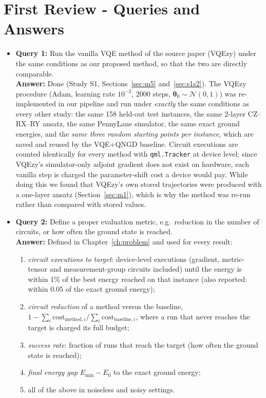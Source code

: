 \documentclass{ssnreview}
\begin{document}
\chapter{First Review - Queries and Answers}
\begin{itemize}
  \item \textbf{Query 1:} Run the vanilla VQE method of the source paper (VQEzy) under the
        same conditions as our proposed method, so that the two are directly comparable. \\
        \textbf{Answer:} Done (Study S1, Sections~\ref{sec:m5} and~\ref{sec:s1s2}). The VQEzy
        procedure (Adam, learning rate $10^{-3}$, 2000 steps,
        $\boldsymbol\theta_0\sim\mathcal N(0,1)$) was re-implemented in our pipeline and run under
        \emph{exactly} the same conditions as every other study: the same 158 held-out test
        instances, the same 2-layer CZ--RX--RY ansatz, the same PennyLane simulator, the same
        exact ground energies, and the \emph{same three random starting points per instance},
        which are saved and reused by the VQE+QNGD baseline. Circuit executions are counted
        identically for every method with \texttt{qml.Tracker} at device level; since VQEzy's
        simulator-only adjoint gradient does not exist on hardware, each vanilla step is charged
        the parameter-shift cost a device would pay. While doing this we found that VQEzy's own
        stored trajectories were produced with a one-layer ansatz (Section~\ref{sec:m1}), which
        is why the method was re-run rather than compared with stored values.
  \item \textbf{Query 2:} Define a proper evaluation metric, e.g.\ reduction in the number of
        circuits, or how often the ground state is reached. \\
        \textbf{Answer:} Defined in Chapter~\ref{ch:problem} and used for every result:
        \begin{enumerate}[label=(\roman*)]
          \item \emph{circuit executions to target}: device-level executions (gradient,
                metric-tensor and measurement-group circuits included) until the energy is
                within 1\% of the best energy reached on that instance (also reported: within
                0.05 of the exact ground energy);
          \item \emph{circuit reduction} of a method versus the baseline,
                $1-\sum_i \text{cost}_{\text{method},i}/\sum_i\text{cost}_{\text{baseline},i}$,
                where a run that never reaches the target is charged its full budget;
          \item \emph{success rate}: fraction of runs that reach the target (how often the
                ground state is reached);
          \item \emph{final energy gap} $E_{\min}-E_0$ to the exact ground energy;
          \item all of the above in noiseless and noisy settings.
        \end{enumerate}
\end{itemize}
\end{document}
